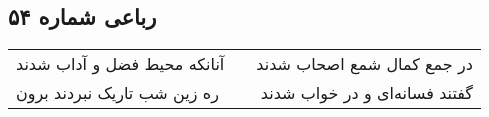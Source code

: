 \begin{center}
\section*{رباعی شماره ۵۴}
\label{sec:sh054}
\begin{longtable}{l p{0.5cm} r}
آنانکه محیط فضل و آداب شدند
&&
در جمع کمال شمع اصحاب شدند
\\
ره زین شب تاریک نبردند برون
&&
گفتند فسانه‌ای و در خواب شدند
\\
\end{longtable}
\end{center}
